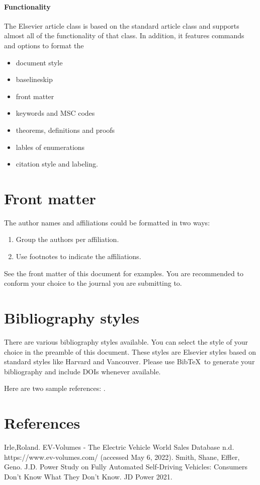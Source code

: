 \documentclass[review]{elsarticle}
\begin{document}
\paragraph{Functionality} The Elsevier article class is based on the standard article class and supports almost all of the functionality of that class. In addition, it features commands and options to format the
\begin{itemize}
\item document style
\item baselineskip
\item front matter
\item keywords and MSC codes
\item theorems, definitions and proofs
\item lables of enumerations
\item citation style and labeling.
\end{itemize}

\section{Front matter}

The author names and affiliations could be formatted in two ways:
\begin{enumerate}[(1)]
\item Group the authors per affiliation.
\item Use footnotes to indicate the affiliations.
\end{enumerate}
See the front matter of this document for examples. You are recommended to conform your choice to the journal you are submitting to.

\section{Bibliography styles}

There are various bibliography styles available. You can select the style of your choice in the preamble of this document. These styles are Elsevier styles based on standard styles like Harvard and Vancouver. Please use Bib\TeX\ to generate your bibliography and include DOIs whenever available.

Here are two sample references: \cite{Feynman1963118,Dirac1953888}.

\section*{References}
\begin{thebibliography}{}
 Irle,Roland. EV-Volumes - The Electric Vehicle World Sales Database n.d. https://www.ev-volumes.com/ (accessed May 6, 2022).
 Smith, Shane, Effler, Geno. J.D. Power Study on Fully Automated Self-Driving Vehicles: Consumers Don’t Know What They Don’t Know. JD Power 2021.

\end{thebibliography}
\end{document}
